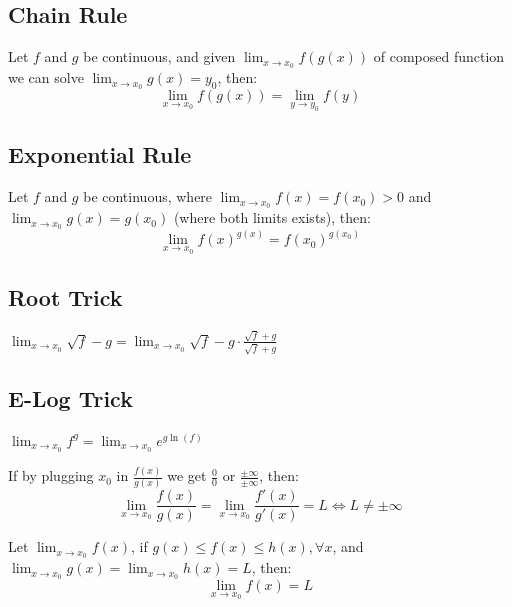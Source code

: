 \documentclass[8pt,a4paper]{extarticle}     %
\theoremstyle{definition}
\theoremstyle{definition}
\theoremstyle{definition}
\begin{document}
\begin{multicols}{4}
\subsection{Chain Rule}
Let $f$ and $g$ be continuous, and given $\lim_{x \to x_0}f(g(x))$ of composed function we can solve $\lim_{x \to x_0}g(x) = y_0$, then: \\
$$\lim_{x \to x_0}f(g(x)) = \lim_{y \to y_0}f(y)$$
\subsection{Exponential Rule}
Let $f$ and $g$ be continuous, where $\lim_{x\to x_0}f(x) = f(x_0) > 0$ and $\lim_{x\to x_0}g(x) = g(x_0)$ (where both limits exists), then:
$$\lim_{x \to x_0}f(x)^{g(x)} = f(x_0)^{g(x_0)}$$
\subsection{Root Trick}
$\displaystyle\lim_{x \to x_0} \sqrt{f}-g = \lim_{x \to x_0} \sqrt{f}- g \cdot \frac{\sqrt{f}+g}{\sqrt{f}+g}$
\subsection{E-Log Trick}
$\displaystyle\lim_{x \to x_0}f^g = \lim_{x \to x_0}e^{g\ln(f)}$
\begin{boxtheorem}
	If by plugging $x_0$ in $\frac{f(x)}{g(x)}$ we get $\frac{0}{0}$ or $\frac{\pm\infty}{\pm\infty}$, then: \\
	$$\displaystyle\lim_{x \to x_0}\frac{f(x)}{g(x)} = \lim_{x \to x_0}\frac{f'(x)}{g'(x)} = L \Leftrightarrow L \neq \pm\infty$$
\end{boxtheorem}
\begin{boxtheorem}
Let $\displaystyle\lim_{x \to x_0}f(x)$, if $g(x) \leq f(x) \leq h(x), \forall x$, and $\displaystyle\lim_{x \to x_0}g(x) = \lim_{x \to x_0}h(x) = L$, then: \\$$\displaystyle\lim_{x \to x_0}f(x) = L$$
\end{boxtheorem}

\end{multicols}
\end{document}
